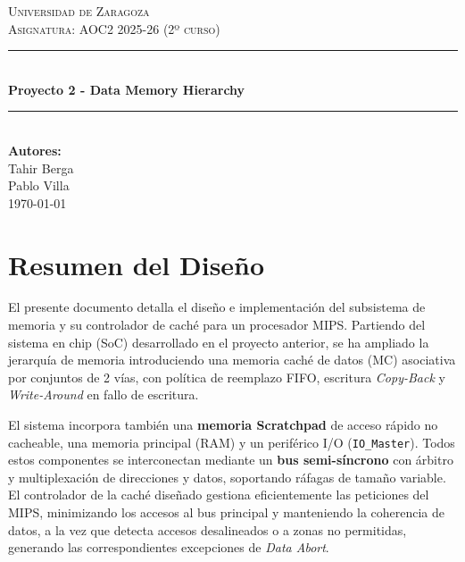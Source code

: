 \documentclass[12pt,a4paper]{article}
\newcommand{\HRule}{\rule{\linewidth}{0.5mm}}
\begin{document}
    \begin{titlepage}
        \centering
        \vspace*{2cm}


        \textsc{\LARGE Universidad de Zaragoza}\\[0.5cm]
        \textsc{\Large Asignatura: AOC2 2025-26 (2º curso)}\\[0.5cm]

        \HRule \\[0.3cm]
        {\Large \bfseries Proyecto 2 - Data Memory Hierarchy}
        \\[0.3cm]
        \HRule \\[1.5cm]

        \textbf{Autores:}\\[0.3cm]
        Tahir Berga \\
        Pablo Villa\\[2cm]

        \vfill
        {\large \today}
    \end{titlepage}

    \tableofcontents
    \newpage

    \section{Resumen del Diseño}
    El presente documento detalla el diseño e implementación del subsistema de memoria y su controlador de caché para un procesador MIPS. Partiendo del sistema en chip (SoC) desarrollado en el proyecto anterior, se ha ampliado la jerarquía de memoria introduciendo una {memoria caché de datos (MC)} asociativa por conjuntos de 2 vías, con política de reemplazo FIFO, escritura \textit{Copy-Back} y \textit{Write-Around} en fallo de escritura. 

    El sistema incorpora también una \textbf{memoria Scratchpad} de acceso rápido no cacheable, una memoria principal (RAM) y un periférico I/O (\texttt{IO\_Master}). Todos estos componentes se interconectan mediante un \textbf{bus semi-síncrono} con árbitro y multiplexación de direcciones y datos, soportando ráfagas de tamaño variable. El controlador de la caché diseñado gestiona eficientemente las peticiones del MIPS, minimizando los accesos al bus principal y manteniendo la coherencia de datos, a la vez que detecta accesos desalineados o a zonas no permitidas, generando las correspondientes excepciones de \textit{Data Abort}.
\end{document}

